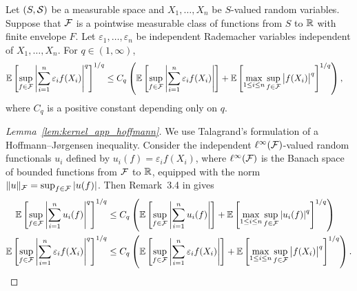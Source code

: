 \begin{lemma}
  \label{lem:kernel_app_hoffmann}

  Let $(S, \mathcal{S})$ be a measurable space
  and $X_1, \ldots, X_n$
  be $S$-valued random variables.
  Suppose that
  $\mathcal{F}$ is a pointwise measurable class of functions from $S$ to $\mathbb{R}$
  with finite envelope $F$.
  Let $\varepsilon_1, \ldots, \varepsilon_n$
  be independent Rademacher variables
  independent of $X_1, \ldots, X_n$.
  For $q \in (1, \infty)$,
  \begin{align*}
    \mathbb{E} \left[
      \sup_{f \in \mathcal{F}}
      \left|
      \sum_{i=1}^n
      \varepsilon_i
      f(X_i)
      \right|
      ^q
    \right]
    ^{1/q}
    &\leq
    C_q
    \left(
      \mathbb{E} \left[
        \sup_{f \in \mathcal{F}}
        \left|
        \sum_{i=1}^n
        \varepsilon_i
        f(X_i)
        \right|
      \right]
      +
      \mathbb{E} \left[
        \max_{1 \leq i \leq n}
        \sup_{f \in \mathcal{F}}
        \big| f(X_i) \big|^q
      \right]^{1/q}
    \right),
  \end{align*}
  where $C_q$ is a positive constant depending only on $q$.

\end{lemma}

\begin{proof}[Lemma~\ref{lem:kernel_app_hoffmann}]

  We use Talagrand's formulation of
  a Hoffmann--J{\o}rgensen inequality.
  Consider the
  independent
  $\ell^\infty(\mathcal{F})$-valued
  random functionals $u_i$ defined by
  $u_i(f) = \varepsilon_i f(X_i)$,
  where $\ell^\infty(\mathcal{F})$
  is the Banach space of bounded functions from
  $\mathcal{F}$ to $\mathbb{R}$,
  equipped with the norm
  $\|u\|_{\mathcal{F}} = \sup_{f \in \mathcal{F}} |u(f)|$.
  Then Remark~3.4 in \citet{kwapien1991hypercontraction} gives
  \begin{align*}
    \mathbb{E} \left[
      \sup_{f \in \mathcal{F}}
      \left|
      \sum_{i=1}^n
      u_i(f)
      \right|
      ^q
    \right]
    ^{1/q}
    &\leq
    C_q
    \left(
      \mathbb{E} \left[
        \sup_{f \in \mathcal{F}}
        \left|
        \sum_{i=1}^n
        u_i(f)
        \right|
      \right]
      +
      \mathbb{E} \left[
        \max_{1 \leq i \leq n}
        \sup_{f \in \mathcal{F}}
        \left|
        u_i(f)
        \right|^q
      \right]^{1/q}
    \right) \\
    \mathbb{E} \left[
      \sup_{f \in \mathcal{F}}
      \left|
      \sum_{i=1}^n
      \varepsilon_i
      f(X_i)
      \right|
      ^q
    \right]
    ^{1/q}
    &\leq
    C_q
    \left(
      \mathbb{E} \left[
        \sup_{f \in \mathcal{F}}
        \left|
        \sum_{i=1}^n
        \varepsilon_i
        f(X_i)
        \right|
      \right]
      +
      \mathbb{E} \left[
        \max_{1 \leq i \leq n}
        \sup_{f \in \mathcal{F}}
        \big| f(X_i) \big|^q
      \right]^{1/q}
    \right).
  \end{align*}
\end{proof}

